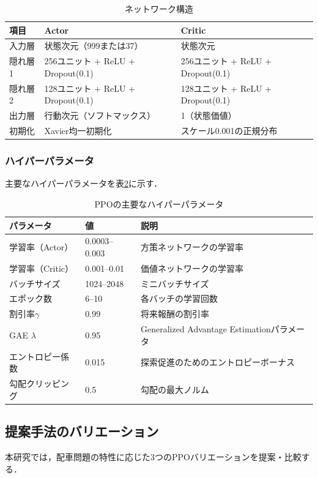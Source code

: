 \begin{table}[htbp]
\centering
\caption{ネットワーク構造}
\label{tab:network_structure}
\begin{tabular}{lll}
\hline
項目 & Actor & Critic \\
\hline
入力層 & 状態次元（999または37） & 状態次元 \\
隠れ層1 & 256ユニット + ReLU + Dropout(0.1) & 256ユニット + ReLU + Dropout(0.1) \\
隠れ層2 & 128ユニット + ReLU + Dropout(0.1) & 128ユニット + ReLU + Dropout(0.1) \\
出力層 & 行動次元（ソフトマックス） & 1（状態価値） \\
初期化 & Xavier均一初期化 & スケール0.001の正規分布 \\
\hline
\end{tabular}
\end{table}
\clearpage

\subsubsection{ハイパーパラメータ}
主要なハイパーパラメータを表\ref{tab:ppo_hyperparameters}に示す．

\begin{table}[htbp]
\centering
\caption{PPOの主要なハイパーパラメータ}
\label{tab:ppo_hyperparameters}
\begin{tabular}{lll}
\hline
パラメータ & 値 & 説明 \\
\hline
学習率（Actor） & 0.0003--0.003 & 方策ネットワークの学習率 \\
学習率（Critic） & 0.001--0.01 & 価値ネットワークの学習率 \\
バッチサイズ & 1024--2048 & ミニバッチサイズ \\
エポック数 & 6--10 & 各バッチの学習回数 \\
割引率$\gamma$ & 0.99 & 将来報酬の割引率 \\
GAE $\lambda$ & 0.95 & Generalized Advantage Estimationパラメータ \\
エントロピー係数 & 0.015 & 探索促進のためのエントロピーボーナス \\
勾配クリッピング & 0.5 & 勾配の最大ノルム \\
\hline
\end{tabular}
\end{table}
\clearpage


\subsection{提案手法のバリエーション}
本研究では，配車問題の特性に応じた3つのPPOバリエーションを提案・比較する．

